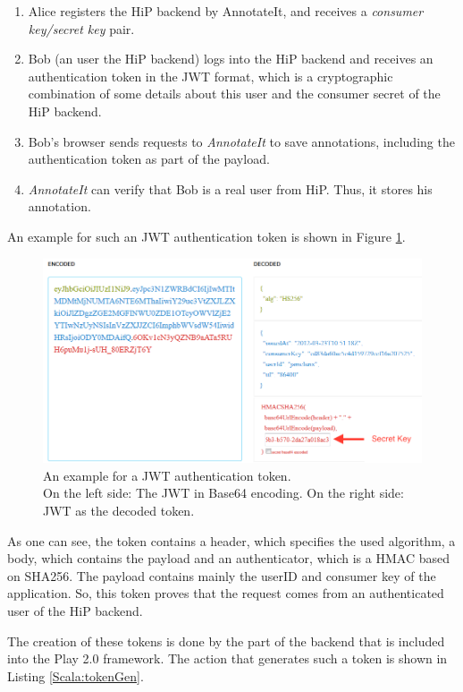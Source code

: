 \begin{enumerate}
\item Alice registers the \ac{HiP} backend by AnnotateIt, and receives a \emph{consumer key/secret key} pair.
\item Bob (an user the \ac{HiP} backend) logs into the \ac{HiP} backend and receives an authentication token in the \ac{JWT} format, which is a cryptographic combination of some details about this user and the consumer secret of the \ac{HiP} backend.
\item Bob's browser sends requests to \emph{AnnotateIt} to save annotations, including the authentication token as part of the payload.
\item \emph{AnnotateIt} can verify that Bob is a real user from \ac{HiP}. Thus, it stores his annotation.
\end{enumerate}

An example for such an \ac{JWT} authentication token is shown in Figure \ref{JWT}.

\begin{figure}[th]
\centerline{\includegraphics[width=1\textwidth]{gfx/JWT_b}}
\caption{An example for a JWT authentication token. \\On the left side: The JWT in Base64 encoding. On the right side: JWT as the decoded token.}
\label{JWT}
\end{figure}

As one can see, the token contains a header, which specifies the used algorithm, a body, which contains the payload and an authenticator, which is a \ac{HMAC} based on \ac{SHA256}. The payload contains mainly the userID and 
consumer key of the application. So, this token proves that the request comes from an authenticated user of the \ac{HiP} backend.

The creation of these tokens is done by the part of the backend that is included into the Play 2.0 framework. The action that generates such a token is shown in Listing \ref{Scala:tokenGen}.

